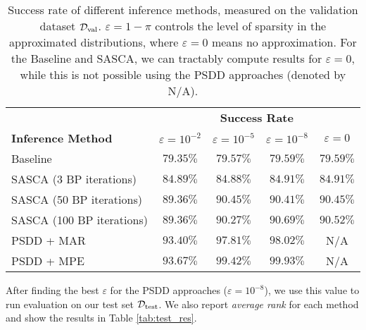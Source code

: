 \begin{table}[H]
    \centering
	\begin{tabular}{|l | c | c | c | c |}
		\hline
    \multicolumn{1}{|l|}{} & \multicolumn{4}{c|}{\textbf{Success Rate}} \\
    \cline{2-5}
    \multicolumn{1}{|l|}{\textbf{Inference Method}} & $\varepsilon = 10^{-2}$ & $\varepsilon = 10^{-5}$ & $\varepsilon = 10^{-8}$ & $\varepsilon = 0$\\
	\hline %

		Baseline & $79.35 \%$ & $79.57 \%$ & $79.59 \%$ & $\mathbf{79.59} \%$ \\ \hline
		SASCA (3 BP iterations)  & $84.89 \%$ & $84.88 \%$ & $84.91 \%$ & $\mathbf{84.91} \%$ \\ \hline
		SASCA (50 BP iterations)  & $89.36 \%$ & $90.45 \%$ & $90.41 \%$ & $\mathbf{90.45} \%$ \\ \hline
		SASCA (100 BP iterations)  & $89.36 \%$ & $90.27 \%$ & $\mathbf{90.69} \%$ & $90.52 \%$ \\ \hline
		PSDD + MAR  & $93.40 \%$ & $97.81 \%$ & $\mathbf{98.02} \%$ & N/A \\ \hline
		PSDD + MPE  & $93.67 \%$ & $99.42 \%$ & $\mathbf{99.93} \%$ & N/A \\ \hline
	\end{tabular}
	\caption{Success rate of different inference methods, measured on the validation dataset $\mathcal{D}_{\text{val}}$. $\varepsilon = 1 - \pi$ controls the level of sparsity in the approximated distributions, where $\varepsilon = 0$ means no approximation. For the Baseline and SASCA, we can tractably compute results for $\varepsilon = 0$, while this is not possible using the PSDD approaches (denoted by N/A).}
    \label{tab:main_res}
\end{table}

After finding the best $\varepsilon$ for the PSDD approaches ($\varepsilon = 10^{-8}$), we use this value to run evaluation on our test set $\mathcal{D}_{\text{test}}$. We also report \emph{average rank} for each method and show the results in Table \ref{tab:test_res}.

